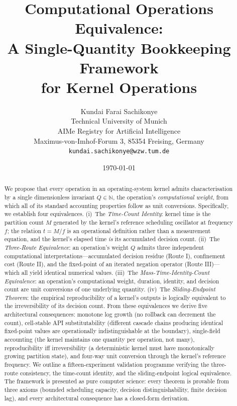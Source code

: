 \documentclass[twocolumn,11pt,a4paper]{article}
\title{\textbf{Computational Operations Equivalence:\\[3pt]
A Single-Quantity Bookkeeping Framework\\[2pt]
for Kernel Operations}}
\author{Kundai Farai Sachikonye\\
Technical University of Munich\\
AIMe Registry for Artificial Intelligence\\
Maximus-von-Imhof-Forum 3, 85354 Freising, Germany\\
\texttt{kundai.sachikonye@wzw.tum.de}}
\date{\today}
\newcommand{\Natural}{\mathbb{N}}
\newcommand{\Mcount}{M}
\newcommand{\Qweight}{Q}
\begin{document}
\maketitle

\begin{abstract}
We propose that every operation in an operating-system kernel admits characterisation by a single dimensionless invariant $\Qweight \in \Natural$, the operation's \emph{computational weight}, from which all of its standard accounting properties follow as unit conversions. Specifically, we establish four equivalences. (i)~The \emph{Time-Count Identity}: kernel time is the partition count $\Mcount$ generated by the kernel's reference scheduling oscillator at frequency $f$; the relation $t = \Mcount/f$ is an operational definition rather than a measurement equation, and the kernel's elapsed time \emph{is} its accumulated decision count. (ii)~The \emph{Three-Route Equivalence}: an operation's weight $\Qweight$ admits three independent computational interpretations---accumulated decision residue (Route I), confinement cost (Route II), and the fixed-point of an iterated negation operator (Route III)---which all yield identical numerical values. (iii)~The \emph{Mass-Time-Identity-Count Equivalence}: an operation's computational weight, duration, identity, and decision count are unit conversions of one underlying quantity. (iv)~The \emph{Sliding-Endpoint Theorem}: the empirical reproducibility of a kernel's outputs is logically equivalent to the irreversibility of its decision count. From these equivalences we derive five architectural consequences: monotone log growth (no rollback can decrement the count), cell-stable API substitutability (different cascade chains producing identical fixed-point values are operationally indistinguishable at the boundary), single-field accounting (the kernel maintains one quantity per operation, not many), reproducibility iff irreversibility (a deterministic kernel must have monotonically growing partition state), and four-way unit conversion through the kernel's reference frequency. We outline a fifteen-experiment validation programme verifying the three-route consistency, the time-count identity, and the sliding-endpoint logical equivalence. The framework is presented as pure computer science: every theorem is provable from three axioms (bounded scheduling capacity, decision distinguishability, finite decision lag), and every architectural consequence has a closed-form derivation.
\end{abstract}
\end{document}
